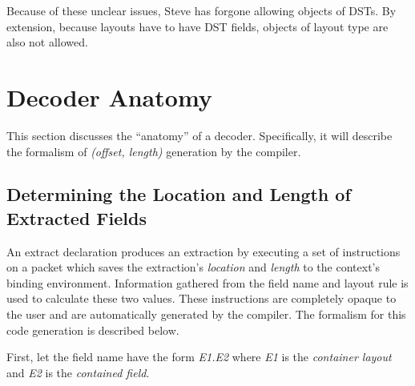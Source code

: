 Because of these unclear issues, Steve has forgone allowing objects of DSTs.
By extension, because layouts have to have DST fields, objects of layout type
are also not allowed.


\section{Decoder Anatomy} \label{decoder_anatomy}

This section discusses the ``anatomy'' of a decoder.
Specifically, it will describe the formalism of \textit{(offset, length)} generation by the compiler.

\subsection{Determining the Location and Length of Extracted Fields}

An extract declaration produces an extraction by executing a set of instructions on a packet which saves the extraction's \textit{location} and \textit{length} to the context's binding environment. Information gathered from the field name and layout rule is used to calculate these two values. These instructions are completely opaque to the user and are automatically generated by the compiler. The formalism for this code generation is described below.

First, let the field name have the form \textit{E1.E2} where \textit{E1} is the \textit{container layout} and \textit{E2} is the \textit{contained field}.

